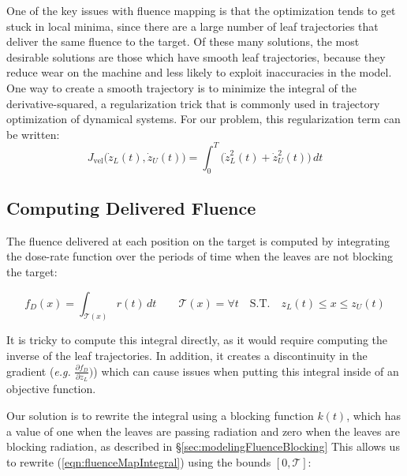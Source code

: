 One of the key issues with fluence mapping is that the
optimization tends to get stuck in local minima,
since there are a large number of leaf trajectories that deliver the same fluence to the target.
Of these many solutions, the most desirable solutions are those which have smooth leaf trajectories,
because they reduce wear on the machine and less likely to exploit inaccuracies in the model.
One way to create a smooth trajectory is to minimize the integral of the derivative-squared,
a regularization trick that is commonly used in trajectory optimization of dynamical systems.
For our problem, this regularization term can be written:
\begin{equation}
  J_\text{vel}\big(\dot{z}_L(t), \dot{z}_U(t)\big)
    = \int_0^T \! \big( \dot{z}_L^2(t) + \dot{z}_U^2(t) \big) \,dt
\end{equation}

\subsection{Computing Delivered Fluence}

The fluence delivered at each position on the target is computed by integrating the
dose-rate function over the periods of time when the leaves are not blocking the target:

\begin{equation}
  f_D(x) = \int_{\mathcal{T}(x)} \! r(t) \,dt
  \quad \quad
  \mathcal{T}(x) = \forall t
  \quad
  \text{S.T.}
  \quad
  z_L(t) \leq x \leq z_U(t)
  \label{eqn:fluenceMapIntegral}
\end{equation}

It is tricky to compute this integral directly, as it would require computing
the inverse of the leaf trajectories.
In addition, it creates a discontinuity in the gradient
(\textit{e.g.} $\tfrac{\partial f_D}{\partial z_L})$)
which can cause issues when putting this integral inside of an objective function.

Our solution is to rewrite the integral using a blocking function $k(t)$,
which has a value of one when the leaves are passing radiation and
zero when the leaves are blocking radiation, as described in \S\ref{sec:modelingFluenceBlocking}
This allows us to rewrite (\ref{eqn:fluenceMapIntegral}) using the bounds $[0, \mathcal{T}]$:

